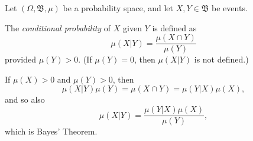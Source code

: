 \documentclass[12pt]{article}
\newcommand{\borel}{\mathfrak{B}}
\begin{document}
Let $(\Omega, \borel, \mu)$ be a probability space, and let $X,Y\in\borel$ be events.

The \emph{conditional probability} of $X$ given $Y$ is defined as
\begin{equation}
\mu(X|Y) = \frac{\mu(X \cap Y)}{\mu(Y)}
\end{equation}
provided $\mu(Y)>0$.
(If $\mu(Y)=0$, then $\mu(X|Y)$ is not defined.)

If $\mu(X)>0$ and $\mu(Y)>0$, then
\begin{equation}
\mu(X|Y)\mu(Y) = \mu(X\cap Y) = \mu(Y|X)\mu(X),
\end{equation}
and so also
\begin{equation}
\mu(X|Y) = \frac{\mu(Y | X)\mu(X)}{\mu(Y)},
\end{equation}
which is Bayes' Theorem.
\end{document}
